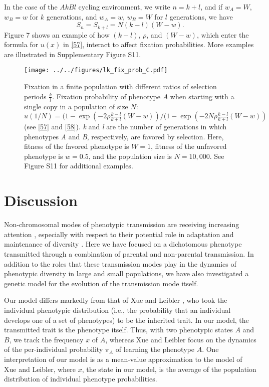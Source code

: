 \documentclass[9pt,twocolumn,twoside,lineno]{pnas-new}
\begin{document}
 In the  case of the $AkBl$ cycling environment, we write $n=k+l$, and if $w_A=W$, $w_B=w$ for $k$ generations, and $w_A=w$, $w_B=W$ for $l$ generations, we have
 \begin{equation}
 S_n=S_{k+l} =N(k-l)(W-w).
 \label{58}\end{equation}
 Figure 7 shows an example of how $(k-l)$, $\rho$, and $(W-w)$, which enter the formula for $u(x)$ in \eqref{57}, interact to affect fixation probabilities. More examples are illustrated in Supplementary Figure S11.

\begin{figure}[h]
\centering
\texttt{[image: ../../figures/lk\_fix\_prob\_C.pdf]}
\caption{Fixation in a finite population with different ratios of selection periods \(\frac{k}{l}\). Fixation probability of phenotype $A$ when starting with a single copy in a population of size $N$: $u(1/N) = (1-\exp(-2 \rho \frac{k-l}{k+l}(W-w))/(1-\exp(-2 N \rho \frac{k-l}{k+l}(W-w))$ (see \eqref{57} and \eqref{58}).
\emph{k} and \emph{l} are the number of
generations in which phenotypes \emph{A} and \emph{B}, respectively, are favored by
selection. Here, fitness of the favored phenotype is $W = 1$, fitness of the unfavored phenotype is $w=0.5$, and the population size is \(N=10,000\). 
See Figure S11 for additional examples.} \label{lk_fix_prob_C}
\end{figure}

 
 \section*{Discussion}

Non-chromosomal modes of phenotypic transmission are receiving increasing attention \cite{whiten2017extension,jaenisch2003epigenetic,allis2016molecular}, especially with respect to their potential role in adaptation and maintenance of diversity \cite{rivoire2014model}. Here we have focused on a dichotomous phenotype transmitted through a combination of parental and non-parental transmission. In addition to the roles that these transmission modes play in the dynamics of phenotypic diversity in large and small populations, we have also investigated a genetic model for the evolution of the transmission mode itself.

Our model differs markedly from that of Xue and Leibler \cite{xue2016evolutionary}, who took the individual phenotypic distribution (i.e., the probability that an individual develops one of a set of phenotypes) to be the inherited trait. In our model, the transmitted trait is the phenotype itself. Thus, with two phenotypic states $A$ and $B$, we track the frequency $x$ of $A$, whereas Xue and Leibler focus on the dynamics of the per-individual probability $\pi_A$ of learning the phenotype $A$. One interpretation of our model is as a mean-value approximation to the model of Xue and Leibler, where $x$, the state in our model, is the average of the population distribution of individual phenotype probabilities. 
\end{document}
